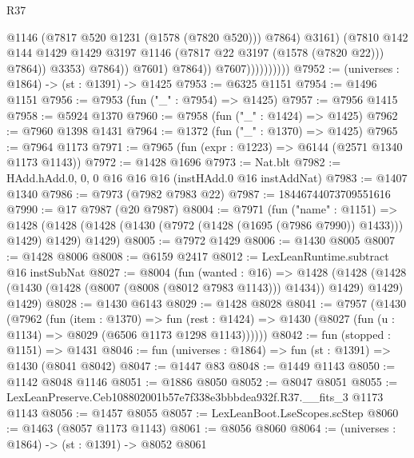 \begin{lexlean}{R37}
\begin{coremodule}
                                          @1146
                                          (@7817 @520 @1231 (@1578 (@7820 @520)))
                                          @7864)
                                        @3161)
                                      (@7810
                                        @142
                                        @144
                                        @1429
                                        @1429
                                        @3197
                                        @1146
                                        (@7817 @22 @3197 (@1578 (@7820 @22)))
                                        @7864))
                                    @3353)
                                  @7864))
                              @7601)
                            @7864))
                        @7607))))))))))
@7952 := (universes : @1864) -> (st : @1391) -> @1425
@7953 := @6325 @1151
@7954 := @1496 @1151
@7956 := @7953 (fun ("_" : @7954) => @1425)
@7957 := @7956 @1415
@7958 := @5924 @1370
@7960 := @7958 (fun ("_" : @1424) => @1425)
@7962 := @7960 @1398 @1431
@7964 := @1372 (fun ("_" : @1370) => @1425)
@7965 := @7964 @1173
@7971 := @7965 (fun (expr : @1223) => @6144 (@2571 @1340 @1173 @1143))
@7972 := @1428 @1696
@7973 := Nat.blt
@7982 := HAdd.hAdd.{0, 0, 0} @16 @16 @16 (instHAdd.{0} @16 instAddNat)
@7983 := @1407 @1340
@7986 := @7973 (@7982 @7983 @22)
@7987 := 18446744073709551616
@7990 := @17 @7987 (@20 @7987)
@8004 := @7971
    (fun ("name" : @1151) =>
    @1428 (@1428 (@1428 (@1430 (@7972 (@1428 (@1695 (@7986 @7990)) @1433))) @1429) @1429) @1429)
@8005 := @7972 @1429
@8006 := @1430 @8005
@8007 := @1428 @8006
@8008 := @6159 @2417
@8012 := LexLeanRuntime.subtract @16 instSubNat
@8027 := @8004
    (fun (wanted : @16) =>
    @1428
      (@1428 (@1428 (@1430 (@1428 (@8007 (@8008 (@8012 @7983 @1143))) @1434)) @1429) @1429)
      @1429)
@8028 := @1430 @6143
@8029 := @1428 @8028
@8041 := @7957
    (@1430
      (@7962
        (fun (item : @1370) =>
        fun (rest : @1424) => @1430 (@8027 (fun (u : @1134) => @8029 (@6506 @1173 @1298 @1143))))))
@8042 := fun (stopped : @1151) => @1431
@8046 := fun (universes : @1864) => fun (st : @1391) => @1430 (@8041 @8042)
@8047 := @1447 @83
@8048 := @1449 @1143
@8050 := @1142 @8048 @1146
@8051 := @1886 @8050
@8052 := @8047 @8051
@8055 := LexLeanPreserve.Ceb108802001b57e7f338e3bbbdea932f.R37.__fits_3 @1173 @1143
@8056 := @1457 @8055
@8057 := LexLeanBoot.LseScopes.scStep
@8060 := @1463 (@8057 @1173 @1143)
@8061 := @8056 @8060
@8064 := (universes : @1864) -> (st : @1391) -> @8052 @8061

\end{coremodule}
\end{lexlean}
